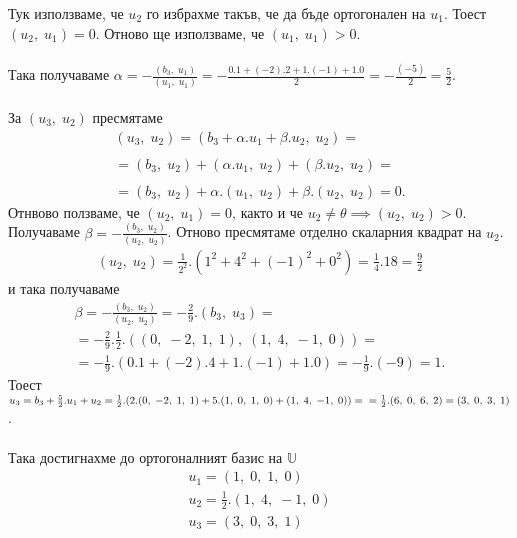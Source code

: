 \documentclass[a4paper, 12pt]{article}
\begin{document}
    Тук използваме, че $u_2$ го избрахме такъв, че да бъде ортогонален на $u_1$.
    Тоест $(u_2, \; u_1) = 0$. Отново ще използваме, че $(u_1, \; u_1) > 0$. \\\\
    Така получаваме $\alpha = -\frac{(b_3, \; u_1)}{(u_1, \; u_1)}
    = -\frac{0.1 + (-2).2 + 1.(-1) + 1.0}{2} = -\frac{(-5)}{2} = \frac{5}{2}$. \\\\
    За $(u_3, \; u_2)$ пресмятаме
    \begin{align*}
        (u_3, \; u_2) = (b_3 + \alpha.u_1 + \beta.u_2, \; u_2) = \\\\
        = (b_3, \; u_2) + (\alpha.u_1, \; u_2) + (\beta.u_2, \; u_2) = \\\\
        = (b_3, \; u_2) + \alpha.(u_1, \; u_2) + \beta.(u_2, \; u_2) = 0.
    \end{align*}
    Отнвово ползваме, че $(u_2, \; u_1) = 0$, както и че $u_2 \neq \theta \implies (u_2, \; u_2) > 0$.
    Получаваме $\beta = -\frac{(b_3, \; u_2)}{(u_2, \; u_2)}$.
    Отново пресмятаме отделно скаларния квадрат на $u_2$.
    \begin{align*}
        (u_2, \; u_2) = \frac{1}{2^2}.(1^2 + 4^2 + (-1)^2 + 0^2) = \frac{1}{4}.18 = \frac{9}{2}
    \end{align*} и така получаваме
    \begin{align*}
        \beta = -\frac{(b_3, \; u_2)}{(u_2, \; u_2)} = -\frac{2}{9}.(b_3, \; u_3) = \\
        = -\frac{2}{9}.\frac{1}{2}.((0, \; -2, \; 1, \; 1), \; (1, \; 4, \; -1, \; 0)) = \\
        = -\frac{1}{9}.(0.1 + (-2).4 + 1.(-1) + 1.0) = -\frac{1}{9}.(-9) = 1.
    \end{align*}
    Тоест $u_3 = b_3 + \frac{5}{2}.u_1 + u_2 =
    \frac{1}{2}.(2.(0, \; -2, \; 1, \; 1) + 5.(1, \; 0, \; 1, \; 0) + (1, \; 4, \; -1, \; 0)) = \\\\
    = \frac{1}{2}.(6, \; 0, \; 6, \; 2) = (3, \; 0, \; 3, \; 1)$. \\\\
    Така достигнахме до ортогоналният базис на $\mathbb{U}$
    \begin{align*}
        u_1 = (1, \; 0, \; 1, \; 0) \\
        u_2 = \frac{1}{2}.(1, \; 4, \; -1, \; 0) \\
        u_3 = (3, \; 0, \; 3, \; 1)
    \end{align*}
\end{document}
